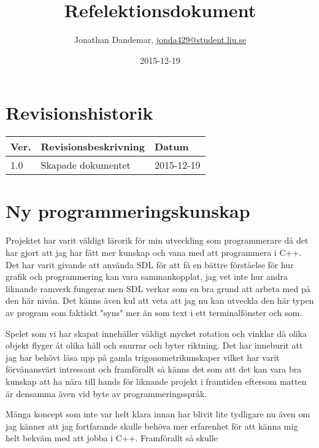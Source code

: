 \documentclass{TDP003mall}
\author{Jonathan Dandemar, \url{jonda429@student.liu.se}\\
 }
\title{Refelektionsdokument}
\date{2015-12-19}
\begin{document}
\projectpage
\section*{Revisionshistorik}
\begin{table}[!h]
\begin{tabularx}{\linewidth}{|l|X|l|}
\hline
Ver. & Revisionsbeskrivning & Datum \\\hline
1.0 & Skapade dokumentet & 2015-12-19 \\\hline
\end{tabularx}
\end{table}

\newpage

\section{Ny programmeringskunskap}
Projektet har varit väldigt lärorik för min utveckling som programmerare då det har gjort att jag har fått mer kunskap och vana 
med att programmera i C++. Det har varit givande att använda SDL för att få en bättre förståelse för hur grafik
och programmering kan vara sammankopplat, jag vet inte hur andra liknande ramverk fungerar men SDL verkar som en bra grund
att arbeta med på den här nivån. Det känns även kul att veta att jag nu kan utveckla den här typen av program som faktiskt "syns"
mer än som text i ett terminalfönster och som. 

Spelet som vi har skapat innehåller väldigt mycket rotation och vinklar då olika objekt flyger åt olika håll och snurrar och byter 
riktning. Det har inneburit att jag har behövt läsa upp på gamla trigonometrikunskaper vilket har varit förvånansvärt intressant
och framförallt så känns det som att det kan vara bra kunskap att ha nära till hands för liknande projekt i framtiden eftersom
matten är densamma även vid byte av programmeringsspråk.  

Många koncept som inte var helt klara innan har blivit lite tydligare nu även om jag känner att jag
fortfarande skulle behöva mer erfarenhet för att känna mig helt bekväm med att jobba i C++. Framförallt så skulle 
\end{document}
